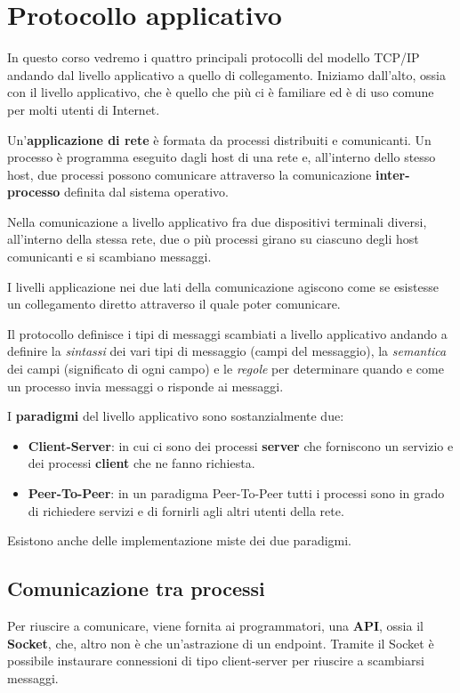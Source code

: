 \chapter{Protocollo applicativo}
In questo corso vedremo i quattro principali protocolli del modello TCP/IP andando dal livello 
applicativo a quello di collegamento. Iniziamo dall'alto, ossia con il livello applicativo, che 
è quello che più ci è familiare ed è di uso comune per molti utenti di Internet.

Un'\textbf{applicazione di rete} è formata da processi distribuiti e comunicanti. Un processo è 
programma eseguito dagli host di una rete e, all'interno dello stesso host, due processi possono
comunicare attraverso la comunicazione \textbf{inter-processo} definita dal sistema operativo.

Nella comunicazione a livello applicativo fra due dispositivi terminali diversi, all'interno della 
stessa rete, due o più processi girano su ciascuno degli host comunicanti e si scambiano messaggi.

I livelli applicazione nei due lati della comunicazione agiscono come se esistesse un collegamento
diretto attraverso il quale poter comunicare.

Il protocollo definisce i tipi di messaggi scambiati a livello applicativo andando a definire la 
\emph{sintassi} dei vari tipi di messaggio (campi del messaggio), la \emph{semantica} dei campi 
(significato di ogni campo) e le \emph{regole} per determinare quando e come un processo invia 
messaggi o risponde ai messaggi.

I \textbf{paradigmi} del livello applicativo sono sostanzialmente due: 
\begin{itemize}
	\item \textbf{Client-Server}: in cui ci sono dei processi \textbf{server} che forniscono un
		servizio e dei processi \textbf{client} che ne fanno richiesta.
	\item \textbf{Peer-To-Peer}: in un paradigma Peer-To-Peer tutti i processi sono in grado di 
		richiedere servizi e di fornirli agli altri utenti della rete.
\end{itemize}
Esistono anche delle implementazione miste dei due paradigmi.

\section{Comunicazione tra processi}
Per riuscire a comunicare, viene fornita ai programmatori, una \textbf{API}, ossia il
\textbf{Socket}, che, altro non è che un'astrazione di un endpoint. Tramite il Socket è possibile 
instaurare connessioni di tipo client-server per riuscire a scambiarsi messaggi.

